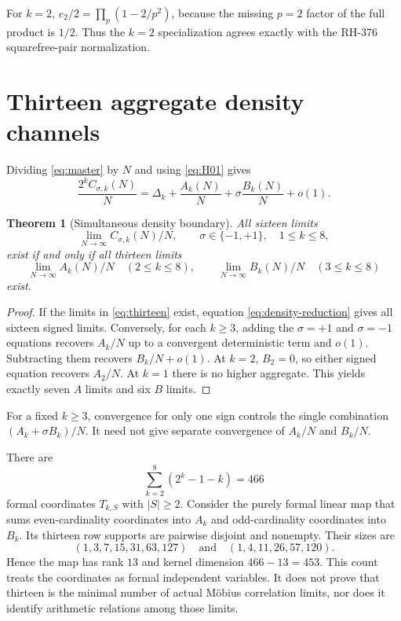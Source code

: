 \documentclass[11pt]{article}
\newtheorem{theorem}{Theorem}[section]
\theoremstyle{definition}
\theoremstyle{remark}
\begin{document}
For $k=2$, $e_2/2=\prod_p(1-2/p^2)$, because the missing $p=2$ factor of
the full product is $1/2$.  Thus the $k=2$ specialization agrees exactly
with the RH-376 squarefree-pair normalization.

\section{Thirteen aggregate density channels}

Dividing \eqref{eq:master} by $N$ and using \eqref{eq:H01} gives
\begin{equation}
 \frac{2^kC_{\sigma,k}(N)}N
 =\Delta_k+\frac{A_k(N)}N+\sigma\frac{B_k(N)}N+o(1).
 \label{eq:density-reduction}
\end{equation}

\begin{theorem}[Simultaneous density boundary]
All sixteen limits
\[
 \lim_{N\to\infty}C_{\sigma,k}(N)/N,
 \qquad \sigma\in\{-1,+1\},\quad1\le k\le8,
\]
exist if and only if all thirteen limits
\begin{equation}
 \lim_{N\to\infty}A_k(N)/N\quad(2\le k\le8),
 \qquad
 \lim_{N\to\infty}B_k(N)/N\quad(3\le k\le8)
 \label{eq:thirteen}
\end{equation}
exist.
\end{theorem}

\begin{proof}
If the limits in \eqref{eq:thirteen} exist, equation
\eqref{eq:density-reduction} gives all sixteen signed limits.  Conversely,
for each $k\ge3$, adding the $\sigma=+1$ and $\sigma=-1$ equations recovers
$A_k/N$ up to a convergent deterministic term and $o(1)$.  Subtracting them
recovers $B_k/N+o(1)$.  At $k=2$, $B_2=0$, so either signed equation
recovers $A_2/N$.  At $k=1$ there is no higher aggregate.  This yields
exactly seven $A$ limits and six $B$ limits.
\end{proof}

For a fixed $k\ge3$, convergence for only one sign controls the single
combination $(A_k+\sigma B_k)/N$.  It need not give separate convergence of
$A_k/N$ and $B_k/N$.

There are
\begin{equation}
 \sum_{k=2}^8(2^k-1-k)=466
 \label{eq:466}
\end{equation}
formal coordinates $T_{k,S}$ with $|S|\ge2$.  Consider the purely formal
linear map that sums even-cardinality coordinates into $A_k$ and
odd-cardinality coordinates into $B_k$.  Its thirteen row supports are
pairwise disjoint and nonempty.  Their sizes are
\[
 (1,3,7,15,31,63,127)\quad\text{and}\quad
 (1,4,11,26,57,120).
\]
Hence the map has rank $13$ and kernel dimension $466-13=453$.  This count
treats the coordinates as formal independent variables.  It does not prove
that thirteen is the minimal number of actual M\"obius correlation limits,
nor does it identify arithmetic relations among those limits.
\end{document}
